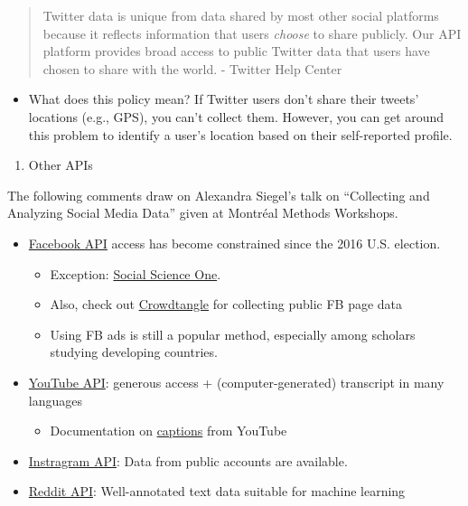 \documentclass[
]{book}
\providecommand{\tightlist}{%
  \setlength{\itemsep}{0pt}\setlength{\parskip}{0pt}}
\begin{document}
\begin{quote}
Twitter data is unique from data shared by most other social platforms because it reflects information that users \emph{choose} to share publicly. Our API platform provides broad access to public Twitter data that users have chosen to share with the world. - Twitter Help Center
\end{quote}

\begin{itemize}
\tightlist
\item
  What does this policy mean? If Twitter users don't share their tweets' locations (e.g., GPS), you can't collect them. However, you can get around this problem to identify a user's location based on their self-reported profile.
\end{itemize}

\begin{enumerate}
\def\labelenumi{\arabic{enumi}.}
\setcounter{enumi}{1}
\tightlist
\item
  Other APIs
\end{enumerate}

The following comments draw on Alexandra Siegel's talk on ``Collecting and Analyzing Social Media Data'' given at Montréal Methods Workshops.

\begin{itemize}
\item
  \href{https://developers.facebook.com/}{Facebook API} access has become constrained since the 2016 U.S. election.

  \begin{itemize}
  \item
    Exception: \href{https://socialscience.one/blog/unprecedented-facebook-urls-dataset-now-available-research-through-social-science-one}{Social Science One}.
  \item
    Also, check out \href{https://www.crowdtangle.com/}{Crowdtangle} for collecting public FB page data
  \item
    Using FB ads is still a popular method, especially among scholars studying developing countries.
  \end{itemize}
\item
  \href{https://developers.google.com/youtube/v3}{YouTube API}: generous access + (computer-generated) transcript in many languages

  \begin{itemize}
  \tightlist
  \item
    Documentation on \href{https://developers.google.com/youtube/v3/docs/captions}{captions} from YouTube
  \end{itemize}
\item
  \href{https://www.instagram.com/developer/}{Instragram API}: Data from public accounts are available.
\item
  \href{https://www.reddit.com/dev/api/}{Reddit API}: Well-annotated text data suitable for machine learning
\end{itemize}
\end{document}
